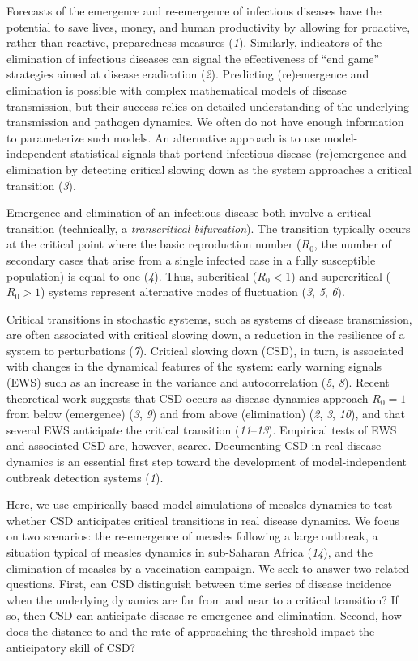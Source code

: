 \documentclass[3p]{elsarticle} %
\begin{document}
Forecasts of the emergence and re-emergence of infectious diseases have
the potential to save lives, money, and human productivity by allowing
for proactive, rather than reactive, preparedness measures (\emph{1}).
Similarly, indicators of the elimination of infectious diseases can
signal the effectiveness of ``end game'' strategies aimed at disease
eradication (\emph{2}). Predicting (re)emergence and elimination is
possible with complex mathematical models of disease transmission, but
their success relies on detailed understanding of the underlying
transmission and pathogen dynamics. We often do not have enough
information to parameterize such models. An alternative approach is to
use model-independent statistical signals that portend infectious
disease (re)emergence and elimination by detecting critical slowing down
as the system approaches a critical transition (\emph{3}).

Emergence and elimination of an infectious disease both involve a
critical transition (technically, a \emph{transcritical bifurcation}).
The transition typically occurs at the critical point where the basic
reproduction number (\(R_0\), the number of secondary cases that arise
from a single infected case in a fully susceptible population) is equal
to one (\emph{4}). Thus, subcritical (\(R_0 < 1\)) and supercritical
(\(R_0 > 1\)) systems represent alternative modes of fluctuation
(\emph{3}, \emph{5}, \emph{6}).

Critical transitions in stochastic systems, such as systems of disease
transmission, are often associated with critical slowing down, a
reduction in the resilience of a system to perturbations (\emph{7}).
Critical slowing down (CSD), in turn, is associated with changes in the
dynamical features of the system: early warning signals (EWS) such as an
increase in the variance and autocorrelation (\emph{5}, \emph{8}).
Recent theoretical work suggests that CSD occurs as disease dynamics
approach \(R_0 = 1\) from below (emergence) (\emph{3}, \emph{9}) and
from above (elimination) (\emph{2}, \emph{3}, \emph{10}), and that
several EWS anticipate the critical transition (\emph{11}--\emph{13}).
Empirical tests of EWS and associated CSD are, however, scarce.
Documenting CSD in real disease dynamics is an essential first step
toward the development of model-independent outbreak detection systems
(\emph{1}).

Here, we use empirically-based model simulations of measles dynamics to
test whether CSD anticipates critical transitions in real disease
dynamics. We focus on two scenarios: the re-emergence of measles
following a large outbreak, a situation typical of measles dynamics in
sub-Saharan Africa (\emph{14}), and the elimination of measles by a
vaccination campaign. We seek to answer two related questions. First,
can CSD distinguish between time series of disease incidence when the
underlying dynamics are far from and near to a critical transition? If
so, then CSD can anticipate disease re-emergence and elimination.
Second, how does the distance to and the rate of approaching the
threshold impact the anticipatory skill of CSD?
\end{document}

